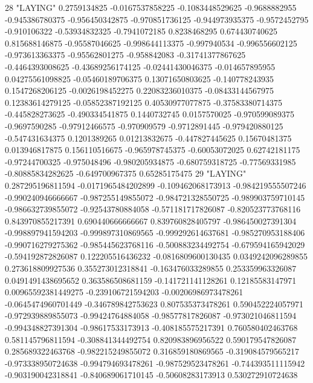 28 "LAYING" 0.2759134825 -0.0167537858225 -0.1083448529625 -0.9688882955 -0.945386780375 -0.956450342875 -0.970851736125 -0.944973935375 -0.9572452795 -0.910106322 -0.53934832325 -0.7941072185 0.8238468295 0.674430740625 0.815688146875 -0.95587046625 -0.998644113375 -0.997940534 -0.996556602125 -0.973613363375 -0.95562801275 -0.958842083 -0.31741377867625 -0.4464393008625 -0.43689256174125 -0.02441430046375 -0.014657895955 0.04275561098825 -0.05460189706375 0.13071650803625 -0.140778243935 0.1547268206125 -0.0026198452275 0.22083236010375 -0.08433144567975 0.12383614279125 -0.05852387192125 0.40530977077875 -0.37583380714375 -0.445828273625 -0.490334541875 0.1440732745 0.0157570025 -0.970599089375 -0.9697590285 -0.97912466575 -0.970909579 -0.9712891445 -0.979420880125 -0.547431634375 0.1201389265 0.01213832675 -0.447827445625 0.15670481375 0.013946817875 0.156110516675 -0.965978745375 -0.60053072025 0.62742181175 -0.97244700325 -0.975048496 -0.980205934875 -0.680759318725 -0.77569331985 -0.80885834282625 -0.649700967375 0.65285175475
29 "LAYING" 0.287295196811594 -0.0171965484202899 -0.109462068173913 -0.984219555507246 -0.990240946666667 -0.987255149855072 -0.984721328550725 -0.989903759710145 -0.986632739855072 -0.92543780884058 -0.571181717826087 -0.820523773768116 0.843970855217391 0.690440666666667 0.839760828405797 -0.986450027391304 -0.998897941594203 -0.999897310869565 -0.999292614637681 -0.985270953188406 -0.990716279275362 -0.985445623768116 -0.500883234492754 -0.679594165942029 -0.594192872826087 0.122205516436232 -0.0816809600130435 0.0349242096289855 0.273618809927536 0.355273012318841 -0.163476033289855 0.253359963326087 0.0491491438695652 0.363586508681159 -0.141721141128261 0.12185583147971 0.00965592381449275 -0.239106721594203 -0.00206986973478261 -0.0645474960701449 -0.346789842753623 0.807535373478261 0.590452224057971 -0.972939889855073 -0.99424764884058 -0.98577817826087 -0.973021046811594 -0.994348827391304 -0.98617533173913 -0.408185575217391 0.760580402463768 0.581145796811594 -0.308841344492754 0.820983896956522 0.590179547826087 0.285689322463768 -0.982215249855072 0.316859180869565 -0.319084579565217 -0.973338950724638 -0.994794693478261 -0.987529523478261 -0.744393511115942 -0.903190042318841 -0.840689061710145 -0.50608283173913 0.530272910724638
